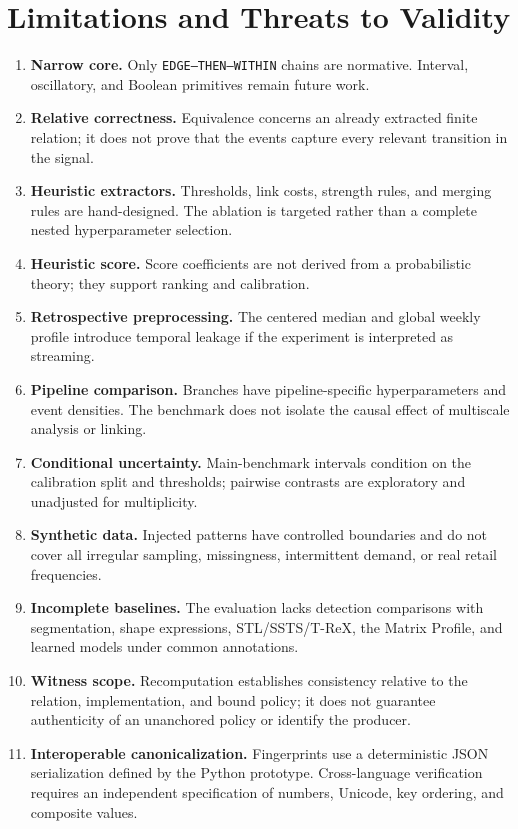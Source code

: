 \documentclass[11pt,a4paper]{article}
\newcommand{\code}[1]{\texttt{#1}}
\begin{document}
\section{Limitations and Threats to Validity}

\begin{enumerate}
  \item \textbf{Narrow core.} Only \code{EDGE--THEN--WITHIN} chains are normative. Interval, oscillatory, and Boolean primitives remain future work.
  \item \textbf{Relative correctness.} Equivalence concerns an already extracted finite relation; it does not prove that the events capture every relevant transition in the signal.
  \item \textbf{Heuristic extractors.} Thresholds, link costs, strength rules, and merging rules are hand-designed. The ablation is targeted rather than a complete nested hyperparameter selection.
  \item \textbf{Heuristic score.} Score coefficients are not derived from a probabilistic theory; they support ranking and calibration.
  \item \textbf{Retrospective preprocessing.} The centered median and global weekly profile introduce temporal leakage if the experiment is interpreted as streaming.
  \item \textbf{Pipeline comparison.} Branches have pipeline-specific hyperparameters and event densities. The benchmark does not isolate the causal effect of multiscale analysis or linking.
  \item \textbf{Conditional uncertainty.} Main-benchmark intervals condition on the calibration split and thresholds; pairwise contrasts are exploratory and unadjusted for multiplicity.
  \item \textbf{Synthetic data.} Injected patterns have controlled boundaries and do not cover all irregular sampling, missingness, intermittent demand, or real retail frequencies.
  \item \textbf{Incomplete baselines.} The evaluation lacks detection comparisons with segmentation, shape expressions, STL/SSTS/T-ReX, the Matrix Profile, and learned models under common annotations.
  \item \textbf{Witness scope.} Recomputation establishes consistency relative to the relation, implementation, and bound policy; it does not guarantee authenticity of an unanchored policy or identify the producer.
  \item \textbf{Interoperable canonicalization.} Fingerprints use a deterministic JSON serialization defined by the Python prototype. Cross-language verification requires an independent specification of numbers, Unicode, key ordering, and composite values.

\end{enumerate}
\end{document}
